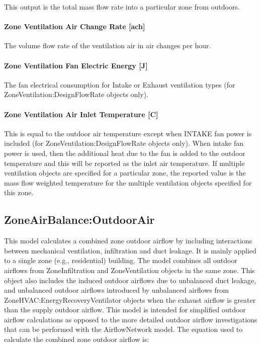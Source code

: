 This output is the total mass flow rate into a particular zone from outdoors.

\paragraph{Zone Ventilation Air Change Rate {[}ach{]}}\label{zone-ventilation-air-change-rate-ach}

The volume flow rate of the ventilation air in air changes per hour.

\paragraph{Zone Ventilation Fan Electric Energy {[}J{]}}\label{zone-ventilation-fan-electric-energy-j}

The fan electrical consumption for Intake or Exhaust ventilation types (for ZoneVentilation:DesignFlowRate objects only).

\paragraph{Zone Ventilation Air Inlet Temperature {[}C{]}}\label{zone-ventilation-air-inlet-temperature-c}

This is equal to the outdoor air temperature except when INTAKE fan power is included (for ZoneVentilation:DesignFlowRate objects only). When intake fan power is used, then the additional heat due to the fan is added to the outdoor temperature and this will be reported as the inlet air temperature. If multiple ventilation objects are specified for a particular zone, the reported value is the mass flow weighted temperature for the multiple ventilation objects specified for this zone.

\subsection{ZoneAirBalance:OutdoorAir}\label{zoneairbalanceoutdoorair}

This model calculates a combined zone outdoor airflow by including interactions between mechanical ventilation, infiltration and duct leakage. It is mainly applied to a single zone (e.g., residential) building. The model combines all outdoor airflows from ZoneInfiltration and ZoneVentilation objects in the same zone. This object also includes the induced outdoor airflows due to unbalanced duct leakage, and unbalanced outdoor airflows introduced by unbalanced airflows from ZoneHVAC:EnergyRecoveryVentilator objects when the exhaust airflow is greater than the supply outdoor airflow. This model is intended for simplified outdoor airflow calculations as opposed to the more detailed outdoor airflow investigations that can be performed with the AirflowNetwork model. The equation used to calculate the combined zone outdoor airflow is:

